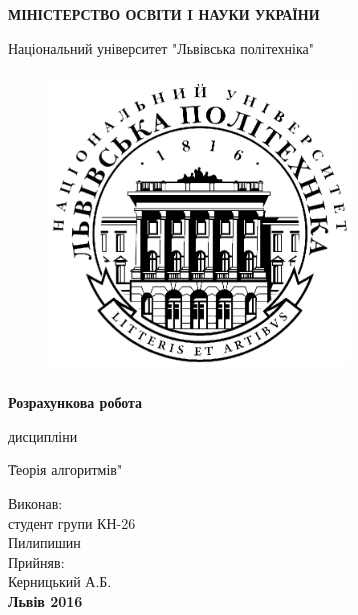 \documentclass[a4paper,12pt]{article}
\begin{document}
 

\begin{titlepage} 
\begin{center} 
\large 
\textbf {МІНІСТЕРСТВО ОСВІТИ I НАУКИ УКРАЇНИ} 

\large 
Національний університет "Львівська політехніка" 

\begin{figure}[h] 
\includegraphics[width=8cm, height=8cm]{lpLogo} 
\centering	
\end{figure} 

\Large 
\textbf{Розрахункова робота} 

\large	
\з дисципліни 

\large 
\"Теорія алгоритмів" 

\vfill 
\raggedleft 
\normalsize 
Виконав:\\ 
студент групи КН-26\\ 
Пилипишин\\ 
Прийняв:\\ 
Керницький А.Б.\\ 

\vspace{30mm} 
\centering 
\small 
\textbf{Львів 2016} 
\end{center} 
\end{titlepage} 
\end{document}
